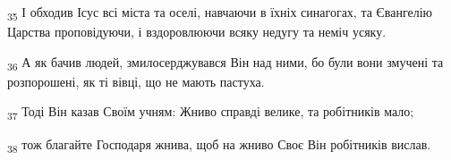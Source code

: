 \begin{tcolorbox}
\textsubscript{35} І обходив Ісус всі міста та оселі, навчаючи в їхніх синагогах, та Євангелію Царства проповідуючи, і вздоровлюючи всяку недугу та неміч усяку.
\end{tcolorbox}
\begin{tcolorbox}
\textsubscript{36} А як бачив людей, змилосерджувався Він над ними, бо були вони змучені та розпорошені, як ті вівці, що не мають пастуха.
\end{tcolorbox}
\begin{tcolorbox}
\textsubscript{37} Тоді Він казав Своїм учням: Жниво справді велике, та робітників мало;
\end{tcolorbox}
\begin{tcolorbox}
\textsubscript{38} тож благайте Господаря жнива, щоб на жниво Своє Він робітників вислав.
\end{tcolorbox}
